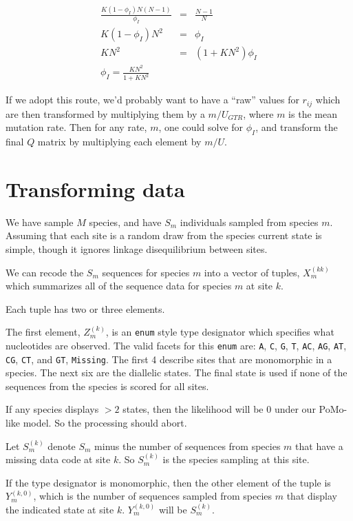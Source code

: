 \documentclass{llncs}
\newcommand{\polyProb}{\ensuremath{\phi}}
\newcommand{\Knorm}{\ensuremath{K}}
\newcommand{\pomo}{PoMo\xspace}
\begin{document}
\begin{eqnarray}
    \frac{\Knorm (1-\polyProb_I)N(N-1)}{\polyProb_I} & = & \frac{N-1}{N} \nonumber \\
    \Knorm (1-\polyProb_I)N^2 & = & \polyProb_I \nonumber \\
    \Knorm N^2 & = & (1 + \Knorm N^2) \polyProb_I \nonumber \\
    \polyProb_I = \frac{\Knorm N^2}{1 + \Knorm N^2}
\end{eqnarray}

If we adopt this route, we'd probably want to have a ``raw'' values for $r_{ij}$ which 
    are then transformed by multiplying them by a $m/U_{GTR}$, where $m$ is the mean
    mutation rate.
Then for any rate, $m$, one could solve for $\polyProb_I$, and transform the
    final $Q$ matrix by multiplying each element by $m/U$.

\section{Transforming data}
We have sample $M$ species, and have $S_m$ individuals sampled from species $m$.
Assuming that each site is a random draw from the species current state is simple, though it ignores
    linkage disequilibrium between sites.

We can recode the $S_m$ sequences for species $m$ into a vector of tuples, $X_m^{(kk)}$ which 
    summarizes all of the sequence data for species $m$ at site $k$.

Each tuple has two or three elements.

The first element, $Z_m^{(k)}$, is an {\tt enum} style type designator which specifies what nucleotides are observed.
The valid facets for this {\tt enum} are: \texttt{A}, \texttt{C}, \texttt{G}, \texttt{T}, \texttt{AC}, \texttt{AG}, \texttt{AT}, \texttt{CG}, \texttt{CT}, and \texttt{GT}, \texttt{Missing}.
The first 4 describe sites that are monomorphic in a species.
The next six are the diallelic states.
The final state is used if none of the sequences from the species is scored for all sites.

If any species displays $>2$ states, then the likelihood will be 0 under our \pomo-like model.
So the processing should abort.

Let $S_m^{(k)}$ denote $S_m$ minus the number of sequences from species $m$ that have a missing data code at site $k$. 
So $S_m^{(k)}$ is the species sampling at this site.

If the type designator is monomorphic, then the other element of the tuple is $Y_m^{(k,0)}$, which is the number of sequences sampled from species $m$ that display the indicated state at site $k$.
$Y_m^{(k,0)}$ will be $S_m^{(k)}$.
\end{document}
